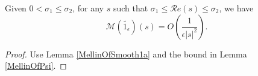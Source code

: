 \begin{lemma}[MellinOfSmooth1b]
\label{MellinOfSmooth1b}
\leanok
Given $0<\sigma_1\le\sigma_2$, for any $s$ such that $\sigma_1\le\mathcal Re(s)\le\sigma_2$,
  we have
  $$\mathcal{M}(\widetilde{1_{\epsilon}})(s) = O\left(\frac{1}{\epsilon|s|^2}\right).$$
\end{lemma}
\begin{proof}
\leanok
Use Lemma \ref{MellinOfSmooth1a} and the bound in Lemma \ref{MellinOfPsi}.
\end{proof}
